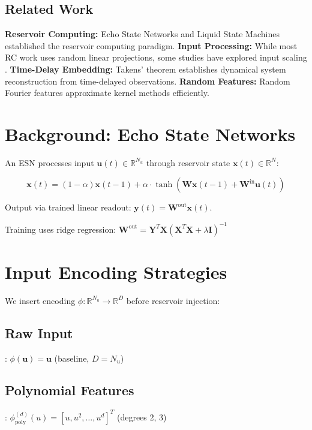 \documentclass[11pt]{article}
\begin{document}
\subsection{Related Work}

\textbf{Reservoir Computing:} Echo State Networks \cite{jaeger2001echo} and Liquid State Machines \cite{maass2002real} established the reservoir computing paradigm. \textbf{Input Processing:} While most RC work uses random linear projections, some studies have explored input scaling \cite{jaeger2007optimization}. \textbf{Time-Delay Embedding:} Takens' theorem \cite{takens1981detecting} establishes dynamical system reconstruction from time-delayed observations. \textbf{Random Features:} Random Fourier features \cite{rahimi2007random} approximate kernel methods efficiently.

\section{Background: Echo State Networks}

An ESN processes input $\mathbf{u}(t) \in \mathbb{R}^{N_u}$ through reservoir state $\mathbf{x}(t) \in \mathbb{R}^N$:

\begin{equation}
\mathbf{x}(t) = (1-\alpha)\mathbf{x}(t-1) + \alpha \cdot \tanh\left(\mathbf{W}\mathbf{x}(t-1) + \mathbf{W}^{\text{in}}\mathbf{u}(t)\right)
\end{equation}

Output via trained linear readout: $\mathbf{y}(t) = \mathbf{W}^{\text{out}}\mathbf{x}(t)$.

Training uses ridge regression: $\mathbf{W}^{\text{out}} = \mathbf{Y}^T \mathbf{X} \left(\mathbf{X}^T\mathbf{X} + \lambda \mathbf{I}\right)^{-1}$

\section{Input Encoding Strategies}

We insert encoding $\phi: \mathbb{R}^{N_u} \rightarrow \mathbb{R}^{D}$ before reservoir injection:

\subsection{Raw Input}: $\phi(\mathbf{u}) = \mathbf{u}$ (baseline, $D = N_u$)

\subsection{Polynomial Features}: $\phi_{\text{poly}}^{(d)}(u) = [u, u^2, \ldots, u^d]^T$ (degrees 2, 3)
\end{document}
